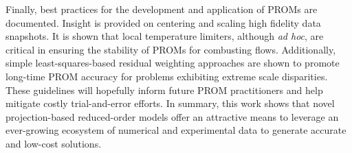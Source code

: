 Finally, best practices for the development and application of PROMs are documented. Insight is provided on  centering and scaling high fidelity data snapshots. It is shown that local temperature limiters, although \textit{ad hoc}, are critical in ensuring the stability of PROMs for combusting flows. Additionally, simple least-squares-based residual weighting approaches are shown to promote long-time PROM accuracy for problems exhibiting extreme scale disparities. These guidelines will hopefully inform future PROM practitioners and help mitigate costly trial-and-error efforts. In summary, this work shows that  novel projection-based reduced-order models offer an attractive means to leverage an ever-growing ecosystem of numerical and experimental data to generate accurate and low-cost  solutions.
